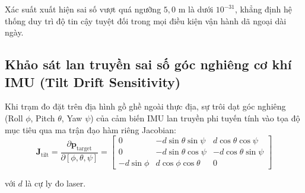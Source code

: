 Xác suất xuất hiện sai số vượt quá ngưỡng $5{,}0$ m là dưới $10^{-31}$, khẳng định hệ thống duy trì độ tin cậy tuyệt đối trong mọi điều kiện vận hành dã ngoại dài ngày.

\subsection{Khảo sát lan truyền sai số góc nghiêng cơ khí IMU (Tilt Drift Sensitivity)}

\hspace{0.5cm} Khi trạm đo đặt trên địa hình gồ ghề ngoài thực địa, sự trôi dạt góc nghiêng (Roll $\phi$, Pitch $\theta$, Yaw $\psi$) của cảm biến IMU lan truyền phi tuyến tính vào tọa độ mục tiêu qua ma trận đạo hàm riêng Jacobian:
\begin{equation}
\mathbf{J}_{\text{tilt}} = \frac{\partial \mathbf{p}_{\text{target}}}{\partial [\phi, \theta, \psi]} = \begin{bmatrix}
0 & -d \sin\theta \sin\psi & d \cos\theta \cos\psi \\
0 & -d \sin\theta \cos\psi & -d \cos\theta \sin\psi \\
-d \sin\phi & d \cos\phi \cos\theta & 0
\end{bmatrix}
\label{eq:tilt-jacobian-matrix-w15}
\end{equation}

với $d$ là cự ly đo laser.

\begin{table}[H]
\centering
\caption{Khảo sát sai số vị trí theo góc trôi dạt IMU tại các cự ly quan sát danh định}
\label{tab:tilt-drift-sensitivity-table-w15}
\end{table}

